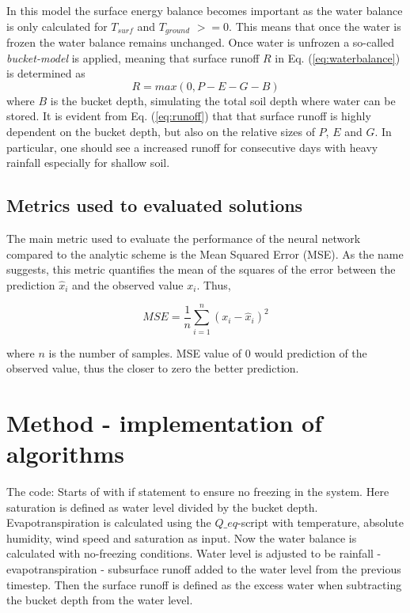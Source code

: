 \documentclass[a4paper,11pt,twocolumn]{article}
\begin{document}
In this model the surface energy balance becomes important as the water balance is only calculated for $T_{surf}$ and $T_{ground}$ $>=0$. This means that once the water is frozen the water balance remains unchanged. Once water is unfrozen a so-called \textit{bucket-model} is applied, meaning that surface runoff $R$ in Eq. (\ref{eq:waterbalance}) is determined as
\begin{equation}
	R = max(0, P-E-G-B)
	\label{eq:runoff}
\end{equation}  
where $B$ is the bucket depth, simulating the total soil depth where water can be stored. It is evident from Eq. (\ref{eq:runoff}) that that surface runoff is highly dependent on the bucket depth, but also on the relative sizes of $P$, $E$ and $G$. In particular, one should see a increased runoff for consecutive days with heavy rainfall especially for shallow soil.  

\subsection{Metrics used to evaluated solutions}

The main metric used to evaluate the performance of the neural network compared to the analytic scheme is the Mean Squared Error (MSE). As the name suggests, this metric quantifies the mean of the squares of the error between the prediction $\hat{x}_i$ and the observed value $x_i$. Thus, 

\begin{equation*}
MSE = \frac{1}{n}\sum_{i=1}^n (x_i - \hat{x}_i)^2
\end{equation*}

where $n$ is the number of samples. MSE value of 0 would prediction of the observed value, thus the closer to zero the better prediction.  
 

\section{Method - implementation of algorithms}
The code: Starts of with if statement to ensure no freezing in the system. Here saturation is defined as water level divided by the bucket depth. Evapotranspiration is calculated using the $Q\_eq$-script with temperature, absolute humidity, wind speed and saturation as input. Now the water balance is calculated with no-freezing conditions. Water level is adjusted to be rainfall - evapotranspiration - subsurface runoff added to the water level from the previous timestep. Then the surface runoff is defined as the excess water when subtracting the bucket depth from the water level. 
\end{document}
